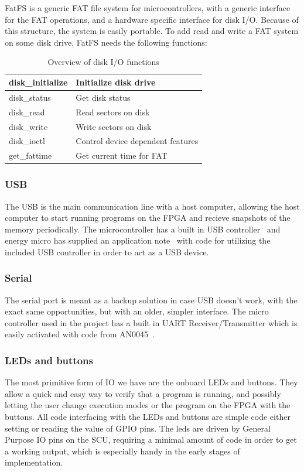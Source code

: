 FatFS is a generic FAT file system for microcontrollers, with a generic interface for the FAT operations, and a hardware specific interface for disk I/O.
Because of this structure, the system is easily portable.
To add read and write a FAT system on some disk drive, FatFS needs the following functions:

\begin{table}
    \begin{tabular}{| l | l |}
        \hline
        disk\_initialize & Initialize disk drive \\
        \hline
        disk\_status & Get disk status \\
        \hline
        disk\_read & Read sectors on disk \\
        \hline
        disk\_write & Write sectors on disk \\
        \hline
        disk\_ioctl & Control device dependent features \\
        \hline
        get\_fattime & Get current time for FAT \\
        \hline
    \end{tabular}
    \caption{Overview of disk I/O functions}
\end{table}

\subsubsection{USB}
The USB is the main communication line with a host computer, allowing the host computer to start running programs on the FPGA and recieve snapshots of the memory periodically.
The microcontroller has a built in USB controller~\cite{efm32gg990-datasheet} and energy micro has supplied an application note~\cite{an0065} with code for utilizing the included USB controller in order to act as a USB device.

\subsubsection{Serial}
The serial port is meant as a backup solution in case USB doesn't work, with the exact same opportunities, but with an older, simpler interface.
The micro controller used in the project has a built in UART Receiver/Transmitter\cite{efm32gg990-datasheet} which is easily activated with code from AN0045~\cite{an0045}.

\subsubsection{LEDs and buttons}
The most primitive form of IO we have are the onboard LEDs and buttons.
They allow a quick and easy way to verify that a program is running, and possibly letting the user change execution modes or the program on the FPGA with the buttons.
All code interfacing with the LEDs and buttons are simple code either setting or reading the value of GPIO pins.
The leds are driven by General Purpose IO pins on the SCU, requiring a minimal amount of code in order to get a working output, which is especially handy in the early stages of implementation.

